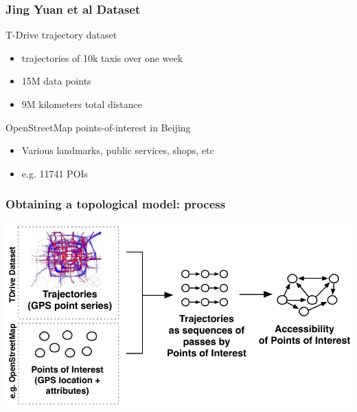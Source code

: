 \documentclass[pdf,10pt]{beamer}
\begin{document}
\begin{frame}[t]\frametitle{Jing Yuan et al Dataset}

T-Drive trajectory dataset
\begin{itemize} 
 \item trajectories of 10k taxis over one week
 \item 15M data points
 \item 9M kilometers total distance 
 \end{itemize}

OpenStreetMap points-of-interest in Beijing
\begin{itemize} 
\item Various landmarks, public services, shops, etc
 \item e.g. 11741 POIs
 \end{itemize}
\end{frame}


\begin{frame}[t]\frametitle{Obtaining a topological model: process}
\vspace{0.45cm}
\begin{center}
\includegraphics[width=1\textwidth]{img/cl1.pdf}
\end{center}
\end{frame}
\end{document}
